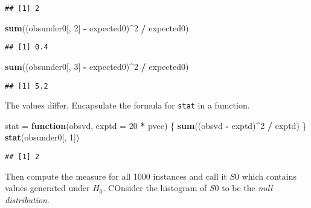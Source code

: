 \documentclass[]{article}
\newenvironment{Shaded}{\begin{snugshade}}{\end{snugshade}}
\newcommand{\KeywordTok}[1]{\textcolor[rgb]{0.13,0.29,0.53}{\textbf{#1}}}
\newcommand{\DataTypeTok}[1]{\textcolor[rgb]{0.13,0.29,0.53}{#1}}
\newcommand{\DecValTok}[1]{\textcolor[rgb]{0.00,0.00,0.81}{#1}}
\newcommand{\StringTok}[1]{\textcolor[rgb]{0.31,0.60,0.02}{#1}}
\newcommand{\ControlFlowTok}[1]{\textcolor[rgb]{0.13,0.29,0.53}{\textbf{#1}}}
\newcommand{\OperatorTok}[1]{\textcolor[rgb]{0.81,0.36,0.00}{\textbf{#1}}}
\newcommand{\NormalTok}[1]{#1}
\begin{document}
\begin{verbatim}
## [1] 2
\end{verbatim}

\begin{Shaded}
\begin{Highlighting}[]
\KeywordTok{sum}\NormalTok{((obsunder0[, }\DecValTok{2}\NormalTok{] }\OperatorTok{-}\StringTok{ }\NormalTok{expected0)}\OperatorTok{^}\DecValTok{2} \OperatorTok{/}\StringTok{ }\NormalTok{expected0)}
\end{Highlighting}
\end{Shaded}

\begin{verbatim}
## [1] 0.4
\end{verbatim}

\begin{Shaded}
\begin{Highlighting}[]
\KeywordTok{sum}\NormalTok{((obsunder0[, }\DecValTok{3}\NormalTok{] }\OperatorTok{-}\StringTok{ }\NormalTok{expected0)}\OperatorTok{^}\DecValTok{2} \OperatorTok{/}\StringTok{ }\NormalTok{expected0)}
\end{Highlighting}
\end{Shaded}

\begin{verbatim}
## [1] 5.2
\end{verbatim}

The values differ. Encapsulate the formula for \texttt{stat} in a
fumction.

\begin{Shaded}
\begin{Highlighting}[]
\NormalTok{stat =}\StringTok{ }\ControlFlowTok{function}\NormalTok{(obsvd, }\DataTypeTok{exptd =} \DecValTok{20} \OperatorTok{*}\StringTok{ }\NormalTok{pvec) \{}
  \KeywordTok{sum}\NormalTok{((obsvd }\OperatorTok{-}\StringTok{ }\NormalTok{exptd)}\OperatorTok{^}\DecValTok{2} \OperatorTok{/}\StringTok{ }\NormalTok{exptd)}
\NormalTok{\}}
\KeywordTok{stat}\NormalTok{(obsunder0[, }\DecValTok{1}\NormalTok{])}
\end{Highlighting}
\end{Shaded}

\begin{verbatim}
## [1] 2
\end{verbatim}

Then compute the measure for all 1000 instances and call it \(S0\) which
contains values generated under \(H_0\). COnsider the histogram of
\(S0\) to be the \emph{null distribution}.
\end{document}
